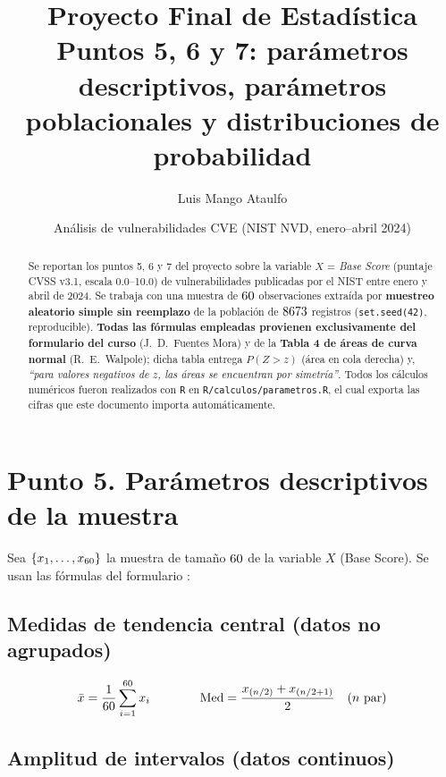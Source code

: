 \documentclass[11pt,a4paper]{article}
\title{\textbf{Proyecto Final de Estadística}\\[4pt]
\large Puntos 5, 6 y 7: parámetros descriptivos, parámetros\\
poblacionales y distribuciones de probabilidad}
\author{Luis Mango Ataulfo}
\date{Análisis de vulnerabilidades CVE (NIST NVD, enero--abril 2024)}
\newcommand{\FP}{\text{[F]}}
\newcommand{\TP}{\text{[T]}}
\begin{document}
\maketitle

\begin{abstract}
\noindent Se reportan los puntos 5, 6 y 7 del proyecto sobre la variable
$X$ = \emph{Base Score} (puntaje CVSS v3.1, escala 0.0--10.0) de
vulnerabilidades publicadas por el NIST entre enero y abril de 2024. Se trabaja
con una muestra de $60$ observaciones extraída por \textbf{muestreo
aleatorio simple sin reemplazo} de la población de $8673$ registros
(\texttt{set.seed(42)}, reproducible). \textbf{Todas las fórmulas empleadas provienen exclusivamente del
formulario del curso \FP} (J.~D.~Fuentes Mora) y de la \textbf{Tabla 4 de
áreas de curva normal \TP} (R.~E.~Walpole); dicha tabla entrega
$P(Z>z)$ (área en cola derecha) y, \emph{``para valores negativos de $z$, las
áreas se encuentran por simetría''}. Todos los cálculos numéricos fueron
realizados con \texttt{R} en \texttt{R/calculos/parametros.R}, el cual exporta
las cifras que este documento importa automáticamente.
\end{abstract}

\tableofcontents
\newpage

\section{Punto 5. Parámetros descriptivos de la muestra}

Sea $\{x_1,\dots,x_{60}\}$ la muestra de tamaño $60$ de la
variable $X$ (Base Score). Se usan las fórmulas del formulario \FP:

\subsection{Medidas de tendencia central (datos no agrupados)}

\[
\bar{x} = \frac{1}{\nMuestra}\sum_{i=1}^{\nMuestra} x_i
\qquad\qquad
\text{Med} = \frac{x_{(n/2)} + x_{(n/2+1)}}{2}\quad (n\ \text{par})
\]

\subsection{Amplitud de intervalos (datos continuos)}
\end{document}
